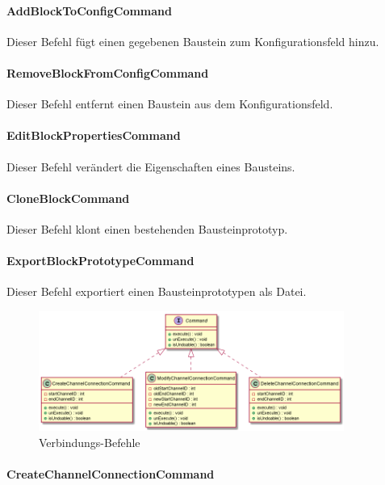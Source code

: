 \documentclass[parskip=full]{scrartcl}
\begin{document}
\paragraph{AddBlockToConfigCommand}

Dieser Befehl fügt einen gegebenen Baustein zum Konfigurationsfeld hinzu.

\paragraph{RemoveBlockFromConfigCommand}

Dieser Befehl entfernt einen Baustein aus dem Konfigurationsfeld.

\paragraph{EditBlockPropertiesCommand}

Dieser Befehl verändert die Eigenschaften eines Bausteins.

\paragraph{CloneBlockCommand}

Dieser Befehl klont einen bestehenden Bausteinprototyp.

\paragraph{ExportBlockPrototypeCommand}

Dieser Befehl exportiert einen Bausteinprototypen als Datei.

\begin{figure}[htbp]
	\begin{center}
		\includegraphics[width = 10cm]{Grafiken/Commands2.png}
		\caption{Verbindungs-Befehle}
		\label{Commands2}
	\end{center}
\end{figure}

\paragraph{CreateChannelConnectionCommand}
\end{document}
